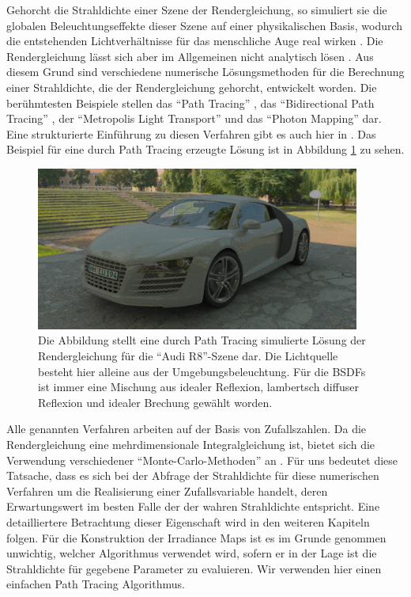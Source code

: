 		Gehorcht die Strahldichte einer Szene der Rendergleichung, so simuliert sie die globalen Beleuchtungseffekte dieser Szene auf einer physikalischen Basis, wodurch die entstehenden Lichtverhältnisse für das menschliche Auge real wirken \cite{kajiya-lte,pbrt3,veach-thesis}.
		Die Rendergleichung lässt sich aber im Allgemeinen nicht analytisch lösen \cite{pbrt3,veach-thesis,kajiya-lte}.
		Aus diesem Grund sind verschiedene numerische Lösungsmethoden für die Berechnung einer Strahldichte, die der Rendergleichung gehorcht, entwickelt worden.
		Die berühmtesten Beispiele stellen das \enquote{Path Tracing} \cite{kajiya-lte}, das \enquote{Bidirectional Path Tracing} \cite{bidirectional-path-tracing}, der \enquote{Metropolis Light Transport} \cite{veach-mlt} und das \enquote{Photon Mapping} \cite{course-photon-map} dar.
		Eine strukturierte Einführung zu diesen Verfahren gibt es auch hier in \cite{pbrt3}.
		Das Beispiel für eine durch Path Tracing erzeugte Lösung ist in Abbildung \ref{fig:example-audi-r8-pt} zu sehen.

		\begin{figure}[h]
			\center
			\includegraphics[width=0.95\textwidth]{pic/example-audi_r8-pt.png}
			\caption{Die Abbildung stellt eine durch Path Tracing simulierte Lösung der Rendergleichung für die \enquote{Audi R8}-Szene dar. Die Lichtquelle besteht hier alleine aus der Umgebungsbeleuchtung. Für die BSDFs ist immer eine Mischung aus idealer Reflexion, lambertsch diffuser Reflexion und idealer Brechung gewählt worden.}
			\label{fig:example-audi-r8-pt}
		\end{figure}

		Alle genannten Verfahren arbeiten auf der Basis von Zufallszahlen.
		Da die Rendergleichung eine mehrdimensionale Integralgleichung ist, bietet sich die Verwendung verschiedener \enquote{Monte-Carlo-Methoden} an \cite{monte-carlo-method}.
		Für uns bedeutet diese Tatsache, dass es sich bei der Abfrage der Strahldichte für diese numerischen Verfahren um die Realisierung einer Zufallsvariable handelt, deren Erwartungswert im besten Falle der der wahren Strahldichte entspricht.
		Eine detailliertere Betrachtung dieser Eigenschaft wird in den weiteren Kapiteln folgen.
		Für die Konstruktion der Irradiance Maps ist es im Grunde genommen unwichtig, welcher Algorithmus verwendet wird, sofern er in der Lage ist die Strahldichte für gegebene Parameter zu evaluieren.
		Wir verwenden hier einen einfachen Path Tracing Algorithmus.

